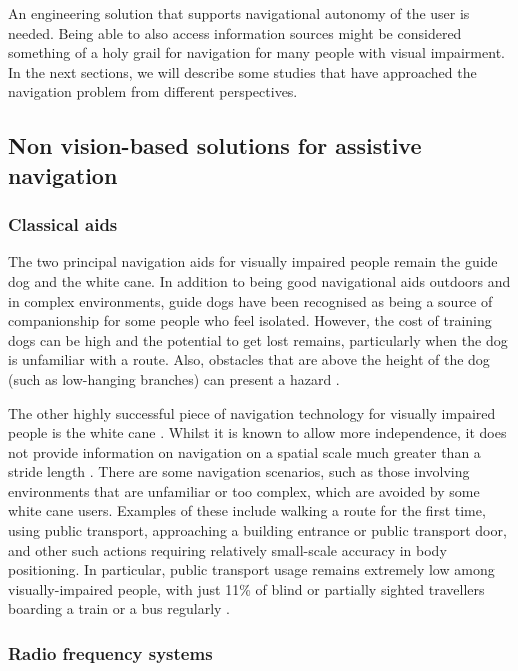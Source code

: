 An engineering solution that supports navigational autonomy of the user is needed. Being able to also access information sources might be considered something of a holy grail for navigation for many people with visual impairment. In the next sections, we will describe some studies that have approached the navigation problem from different perspectives.

\subsection{Non vision-based solutions for assistive navigation}

\subsubsection{Classical aids}

The two principal navigation aids for visually impaired people remain the guide dog and the white cane.  In addition to being good navigational aids outdoors and in complex environments, guide dogs have been recognised as being a source of companionship for some people who feel isolated. However, the cost of training dogs can be high and the potential to get lost remains, particularly when the dog is unfamiliar with a route. Also, obstacles that are above the height of the dog (such as low-hanging branches) can present a hazard \citep{manduchi2011mobility}. 

The other highly successful piece of navigation technology for visually impaired people is the white cane \citep{roentgen2008inventory}.  Whilst it is known to allow more independence, it does not provide information on navigation on a spatial scale much greater than a stride length \citep{maidenbaum2013increasing}. There are some navigation scenarios, such as those involving environments that are unfamiliar or too complex, which are avoided by some white cane users. Examples of these include walking a route for the first time, using public transport, approaching a building entrance or public transport door, and other such actions requiring relatively small-scale accuracy in body positioning. In particular, public transport usage remains extremely low among visually-impaired people, with just 11\% of blind or partially sighted travellers boarding a train or a bus regularly \citep{Pey2006}.

\subsubsection{Radio frequency systems}


